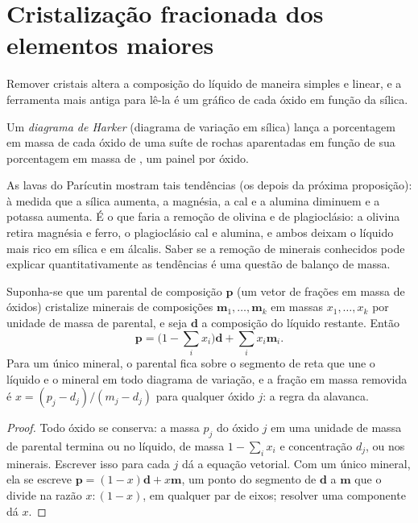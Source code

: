 \section{Cristalização fracionada dos elementos maiores}\label{sec:b2:magmatic-differentiation:majors}

Remover cristais altera a composição do líquido de maneira simples e linear,
e a ferramenta mais antiga para lê-la é um gráfico de cada óxido em função da sílica.

\begin{definition}\label{def:b2:magmatic-differentiation:harker}
Um \emph{diagrama de Harker} (diagrama de variação em sílica) lança a
porcentagem em massa de cada óxido de uma suíte de rochas aparentadas em função de sua
porcentagem em massa de , um painel por óxido.
\end{definition}


As lavas do Parícutin mostram tais tendências (os  depois da próxima
proposição): à medida que a sílica aumenta, a magnésia, a cal e a alumina diminuem e a potassa aumenta. É
o que faria a remoção de olivina e de plagioclásio:
a olivina retira magnésia e ferro, o plagioclásio cal e alumina, e ambos deixam
o líquido mais rico em sílica e em álcalis. Saber se a remoção de minerais conhecidos pode
explicar quantitativamente as tendências é uma questão de balanço de massa.

\begin{proposition}\label{prop:b2:magmatic-differentiation:lever}
Suponha-se que um  parental de composição $\mathbf p$ (um vetor de frações em massa de óxidos) cristalize
minerais de composições $\mathbf m_1, \dots, \mathbf m_k$ em massas
$x_1, \dots, x_k$ por unidade de massa de  parental, e seja $\mathbf d$ a composição
do líquido restante. Então
\[
\mathbf p = \Big(1 - \sum_i x_i\Big)\mathbf d + \sum_i x_i \mathbf m_i .
\]
Para um único mineral, o  parental fica sobre o segmento de reta que une o líquido e o
mineral em todo diagrama de variação, e a fração em massa removida é
$x = (p_j - d_j)/(m_j - d_j)$ para qualquer óxido $j$: a regra da alavanca.
\end{proposition}

\begin{proof}
Todo óxido se conserva: a massa $p_j$ do óxido $j$ em uma unidade de massa de  parental termina
ou no líquido, de massa $1 - \sum_i x_i$ e concentração $d_j$, ou nos
minerais. Escrever isso para cada $j$ dá a equação vetorial. Com um único mineral, ela
se escreve $\mathbf p = (1-x)\mathbf d + x\mathbf m$, um ponto do segmento de
$\mathbf d$ a $\mathbf m$ que o divide na razão $x : (1-x)$, em qualquer par de
eixos; resolver uma componente dá $x$.
\end{proof}

